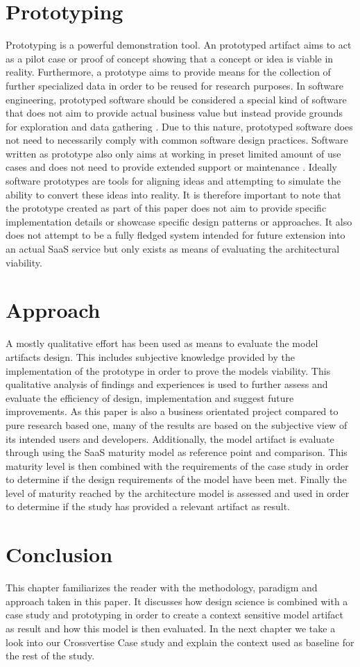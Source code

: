 \section{Prototyping}
Prototyping is a powerful demonstration tool. An prototyped artifact aims to act as a pilot case or proof of concept showing that a concept or idea is viable in reality. Furthermore, a prototype aims to provide means for the collection of further specialized data in order to be reused for research purposes. In software engineering, prototyped software should be considered a special kind of software that does not aim to provide actual business value but instead provide grounds for exploration and data gathering \cite{Monperrus2013}. Due to this nature, prototyped software does not need to necessarily comply with common software design practices. Software written as prototype also only aims at working in preset limited amount of use cases and does not need to provide extended support or maintenance \cite{Monperrus2013}. Ideally software prototypes are tools for aligning ideas and attempting to simulate the ability to convert these ideas into reality.  It is therefore important to note that the prototype created as part of this paper does not aim to provide specific implementation details or showcase specific design patterns or approaches. It also does not attempt to be a fully fledged system intended for future extension into an actual SaaS service but only exists as means of evaluating the architectural viability. 

\section{Approach}
A mostly qualitative effort has been used as means to evaluate the model artifacts design. This includes subjective knowledge provided by the implementation of the prototype in order to prove the models viability. This qualitative analysis of findings and experiences is used to further assess and evaluate the efficiency of design, implementation and suggest future improvements. As this paper is also a business orientated project compared to pure research based one, many of the results are based on the subjective view of its intended users and developers. Additionally, the model artifact is evaluate through using the SaaS maturity model as reference point and comparison. This maturity level is then combined with the requirements of the case study in order to determine if the design requirements of the model have been met. Finally the level of maturity reached by the architecture model is assessed and used in order to determine if the study has provided a relevant artifact as result.

\section{Conclusion}
This chapter familiarizes the reader with the methodology, paradigm and approach taken in this paper. It discusses how design science is combined with a case study and prototyping in order to create a context sensitive model artifact as result and how this model is then evaluated. In the next chapter we take a look into our Crossvertise Case study and explain the context used as baseline for the rest of the study. 

